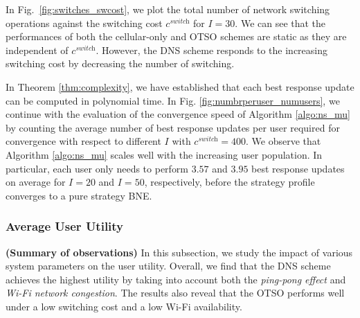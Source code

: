 \documentclass[journal]{IEEEtran}
\begin{document}
	In Fig.~\ref{fig:switches_swcost}, we plot the total number of network switching operations against the switching cost $c^{\textit{switch}}$  for $I = 30$. %
	We can see that the performances of both the cellular-only and OTSO schemes are static as they are independent of $c^{\textit{switch}}$. However, the DNS scheme responds to the increasing switching cost by decreasing the number of switching.



  In Theorem \ref{thm:complexity}, we have established that each best response update can be computed in polynomial time.
  In Fig. \ref{fig:numbrperuser_numusers}, we continue with the evaluation of the convergence speed of Algorithm \ref{algo:ns_mu} by counting the average number of best response updates per user required for convergence with respect to different $I$ with $c^{\textit{switch}} = 400$.
  We observe that Algorithm \ref{algo:ns_mu} scales well with the increasing user population.
  In particular, each user only needs to perform $3.57$ and $3.95$ best response updates on average for $I = 20$ and $I = 50$, respectively, before the strategy profile converges to a pure strategy BNE.	






\subsubsection{Average User Utility} 

  \textbf{(Summary of observations)} In this subsection, we study the impact of various system parameters on the user utility.  	  
	Overall, we find that the DNS scheme achieves the highest utility by taking into account both the \emph{ping-pong effect} and \emph{Wi-Fi network congestion}. 
	The results also reveal that the OTSO performs well under a low switching cost and a low Wi-Fi availability.
\end{document}
